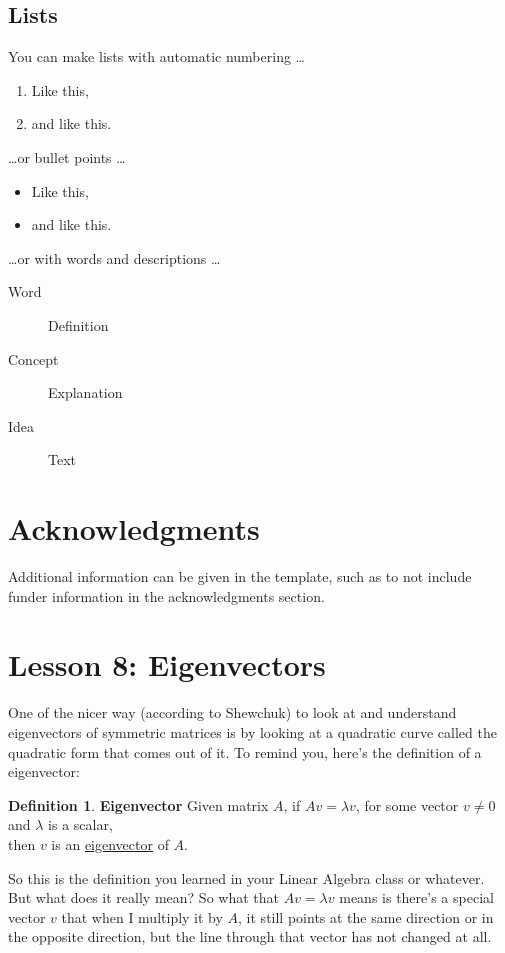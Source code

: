 \documentclass[fleqn,10pt]{olplainarticle}
\theoremstyle{definition}
\newtheorem{definition}{Definition}[section]
\theoremstyle{remark}
\begin{document}
\subsection*{Lists}

You can make lists with automatic numbering \dots

\begin{enumerate}[noitemsep] 
\item Like this,
\item and like this.
\end{enumerate}
\dots or bullet points \dots
\begin{itemize}[noitemsep] 
\item Like this,
\item and like this.
\end{itemize}
\dots or with words and descriptions \dots
\begin{description}
\item[Word] Definition
\item[Concept] Explanation
\item[Idea] Text
\end{description}

\section*{Acknowledgments}

Additional information can be given in the template, such as to not include funder information in the acknowledgments section.



\clearpage
\section*{Lesson 8: Eigenvectors}
One of the nicer way (according to Shewchuk) to look at and understand eigenvectors of symmetric matrices is by looking at a quadratic curve called the quadratic form that comes out of it. To remind you, here's the definition of a eigenvector:


\theoremstyle{definition}
\begin{definition}{\textbf{Eigenvector}}
Given matrix $A$, if $Av = \lambda v$, for some vector $v \neq 0$ and $\lambda$ is a scalar, \\ then $v$ is an \underline{eigenvector} of $A$.
\end{definition}

So this is the definition you learned in your Linear Algebra class or whatever. But what does it really mean? So what that $Av = \lambda v$ means is there's a special vector $v$ that when I multiply it by $A$, it still points at the same direction or in the opposite direction, but the line through that vector has not changed at all. 
\end{document}
